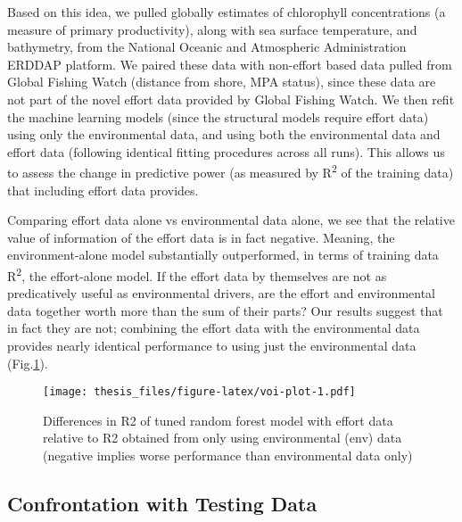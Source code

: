 \documentclass[twoside,12pt,final]{ucthesis-CA2012}
\begin{document}
\begin{ucmainmatter}
Based on this idea, we pulled globally estimates of chlorophyll
concentrations (a measure of primary productivity), along with sea
surface temperature, and bathymetry, from the National Oceanic and
Atmospheric Administration ERDDAP platform. We paired these data with
non-effort based data pulled from Global Fishing Watch (distance from
shore, MPA status), since these data are not part of the novel effort
data provided by Global Fishing Watch. We then refit the machine
learning models (since the structural models require effort data) using
only the environmental data, and using both the environmental data and
effort data (following identical fitting procedures across all runs).
This allows us to assess the change in predictive power (as measured by
R\textsuperscript{2} of the training data) that including effort data
provides.

Comparing effort data alone vs environmental data alone, we see that the
relative value of information of the effort data is in fact negative.
Meaning, the environment-alone model substantially outperformed, in
terms of training data R\textsuperscript{2}, the effort-alone model. If
the effort data by themselves are not as predicatively useful as
environmental drivers, are the effort and environmental data together
worth more than the sum of their parts? Our results suggest that in fact
they are not; combining the effort data with the environmental data
provides nearly identical performance to using just the environmental
data (Fig.\ref{fig:voi-plot}).
\begin{figure}
\centering
\texttt{[image: thesis\_files/figure-latex/voi-plot-1.pdf]}
\caption{\label{fig:voi-plot}Differences in R2 of tuned random forest model
with effort data relative to R2 obtained from only using environmental
(env) data (negative implies worse performance than environmental data
only)}
\end{figure}
\subsection{Confrontation with Testing
Data}\label{confrontation-with-testing-data}


\end{ucmainmatter}
\end{document}
